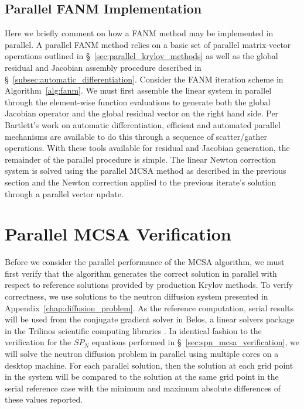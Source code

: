 \subsection{Parallel FANM Implementation}
\label{subsec:parallel_fanm}
Here we briefly comment on how a FANM method may be implemented in
parallel. A parallel FANM method relies on a basic set of parallel
matrix-vector operations outlined in
\S~\ref{sec:parallel_krylov_methods} as well as the global residual
and Jacobian assembly procedure described in
\S~\ref{subsec:automatic_differentiation}. Consider the FANM iteration
scheme in Algorithm~\ref{alg:fanm}. We must first assemble the linear
system in parallel through the element-wise function evaluations to
generate both the global Jacobian operator and the global residual
vector on the right hand side. Per Bartlett's work on automatic
differentiation, efficient and automated parallel mechanisms are
available to do this through a sequence of scatter/gather
operations. With these tools available for residual and Jacobian
generation, the remainder of the parallel procedure is simple. The
linear Newton correction system is solved using the parallel MCSA
method as described in the previous section and the Newton correction
applied to the previous iterate's solution through a parallel vector
update.

\section{Parallel MCSA Verification\ }
\label{sec:parallel_verification}
Before we consider the parallel performance of the MCSA algorithm, we
must first verify that the algorithm generates the correct solution in
parallel with respect to reference solutions provided by production
Krylov methods. To verify correctness, we use solutions to the neutron
diffusion system presented in
Appendix~\ref{chap:diffusion_problem}. As the reference computation,
serial results will be used from the conjugate gradient solver in
Belos, a linear solvers package in the Trilinos scientific computing
libraries \citep{heroux_overview_2005}. In identical fashion to the
verification for the $SP_N$ equations performed in
\S~\ref{sec:spn_mcsa_verification}, we will solve the neutron
diffusion problem in parallel using multiple cores on a desktop
machine. For each parallel solution, then the solution at each grid
point in the system will be compared to the solution at the same grid
point in the serial reference case with the minimum and maximum
absolute differences of these values reported.

